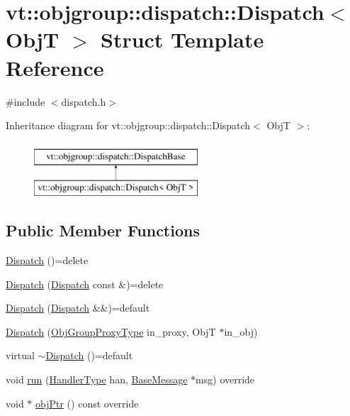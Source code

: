 \hypertarget{structvt_1_1objgroup_1_1dispatch_1_1_dispatch}{}\section{vt\+:\+:objgroup\+:\+:dispatch\+:\+:Dispatch$<$ ObjT $>$ Struct Template Reference}
\label{structvt_1_1objgroup_1_1dispatch_1_1_dispatch}


{\ttfamily \#include $<$dispatch.\+h$>$}

Inheritance diagram for vt\+:\+:objgroup\+:\+:dispatch\+:\+:Dispatch$<$ ObjT $>$\+:\begin{figure}[H]
\begin{center}
\leavevmode
\includegraphics[height=2.000000cm]{structvt_1_1objgroup_1_1dispatch_1_1_dispatch}
\end{center}
\end{figure}
\subsection*{Public Member Functions}
\begin{DoxyCompactItemize}
\item 
\hyperlink{structvt_1_1objgroup_1_1dispatch_1_1_dispatch_ae4fa82d799ff73006340737e2a4f2c13}{Dispatch} ()=delete
\item 
\hyperlink{structvt_1_1objgroup_1_1dispatch_1_1_dispatch_aa36763c5e026720041c4a405a593b9f3}{Dispatch} (\hyperlink{structvt_1_1objgroup_1_1dispatch_1_1_dispatch}{Dispatch} const \&)=delete
\item 
\hyperlink{structvt_1_1objgroup_1_1dispatch_1_1_dispatch_a8287e333b342d531f508a81281a164eb}{Dispatch} (\hyperlink{structvt_1_1objgroup_1_1dispatch_1_1_dispatch}{Dispatch} \&\&)=default
\item 
\hyperlink{structvt_1_1objgroup_1_1dispatch_1_1_dispatch_a61f23161c507dc49e91a12f1592a1e5e}{Dispatch} (\hyperlink{namespacevt_ad7cae989df485fccca57f0792a880a8e}{Obj\+Group\+Proxy\+Type} in\+\_\+proxy, ObjT $\ast$in\+\_\+obj)
\item 
virtual \hyperlink{structvt_1_1objgroup_1_1dispatch_1_1_dispatch_af0c5622152b327cd5a5fb781b6062e42}{$\sim$\+Dispatch} ()=default
\item 
void \hyperlink{structvt_1_1objgroup_1_1dispatch_1_1_dispatch_a9e6b35e9ff07fcc30c69b37fed60f770}{run} (\hyperlink{namespacevt_af64846b57dfcaf104da3ef6967917573}{Handler\+Type} han, \hyperlink{namespacevt_ac34f95a5e2b8109b55bfba52b074443d}{Base\+Message} $\ast$msg) override
\item 
void $\ast$ \hyperlink{structvt_1_1objgroup_1_1dispatch_1_1_dispatch_aea2f9957c5f4b07413a205d34bcfbd5c}{obj\+Ptr} () const override
\end{DoxyCompactItemize}
